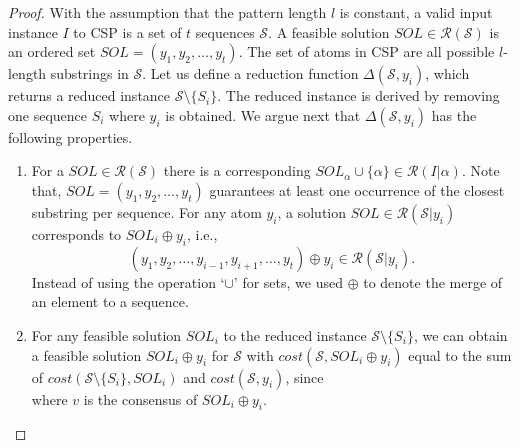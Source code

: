 \documentclass[journal]{acm_proc_article-sp}
\begin{document}
\begin{proof}
With the assumption that the pattern length $l$ is constant, a valid input instance $I$ to CSP is a set of $t$ sequences $\mathcal{S}$. A feasible solution $SOL \in \mathcal{R}(\mathcal{S})$ is an ordered set  $SOL = (y_1, y_2, \ldots, y_t)$. The set of atoms in CSP are all possible $l$-length substrings in $\mathcal{S}$.
Let us define a reduction function $\Delta(\mathcal{S}, y_i)$, which returns a reduced instance $\mathcal{S} \setminus \{S_i\}$.
The reduced instance is derived by removing one sequence $S_i$  where $y_i$ is obtained. We argue next that $\Delta(\mathcal{S}, y_i)$ has the following properties.

\begin{enumerate}
\item For a $SOL \in \mathcal{R}(\mathcal{S})$ there is a corresponding  $SOL_\alpha \cup \{\alpha\} \in \mathcal{R}(I| \alpha)$. Note that,  $SOL = (y_1, y_2, \ldots, y_t)$ guarantees at least one occurrence of the closest substring per sequence. For any atom $y_i$, a solution $SOL \in \mathcal{R}(\mathcal{S}|y_i)$ corresponds to $SOL_{i} \oplus  y_i $, i.e.,
 $$(y_1,y_2, \ldots, y_{i-1}, y_{i+1}, \ldots, y_t) \oplus y_i \in \mathcal{R}(\mathcal{S} | y_i ).$$
Instead of using the operation 
`$\cup$' for sets, we used $\oplus$ to denote the merge of an element to a sequence.
\item For any feasible solution $SOL_i$ to the reduced instance $\mathcal{S} \setminus \{S_i\}$, we can obtain a feasible solution $SOL_i\oplus y_i$ for $\mathcal{S}$ with $cost(\mathcal{S}, SOL_i\oplus y_i) $  equal to the sum of $ cost(\mathcal{S}\setminus \{S_i\}, SOL_i) $ and $cost(\mathcal{S}, y_i) $, since\\

where $v$ is the consensus of $SOL_i\oplus y_i$.
\end{enumerate}
\end{proof}
\end{document}
